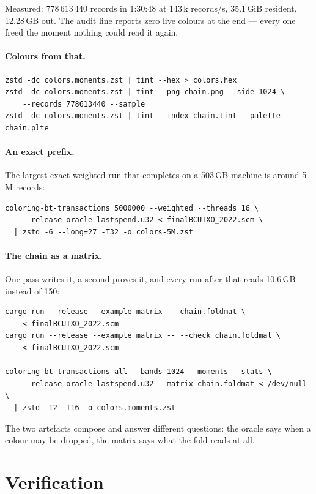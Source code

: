 \documentclass[11pt,a4paper]{article}
\begin{document}
Measured: $778\,613\,440$ records in 1:30:48 at 143\,k records/s, 35.1\,GiB
resident, 12.28\,GB out. The audit line reports zero live colours at the end ---
every one freed the moment nothing could read it again.

\paragraph{Colours from that.}

\begin{lstlisting}
zstd -dc colors.moments.zst | tint --hex > colors.hex
zstd -dc colors.moments.zst | tint --png chain.png --side 1024 \
    --records 778613440 --sample
zstd -dc colors.moments.zst | tint --index chain.tint --palette chain.plte
\end{lstlisting}

\paragraph{An exact prefix.} The largest exact weighted run that completes on a
503\,GB machine is around 5\,M records:

\begin{lstlisting}
coloring-bt-transactions 5000000 --weighted --threads 16 \
    --release-oracle lastspend.u32 < finalBCUTXO_2022.scm \
  | zstd -6 --long=27 -T32 -o colors-5M.zst
\end{lstlisting}

\paragraph{The chain as a matrix.} One pass writes it, a second proves it, and
every run after that reads 10.6\,GB instead of 150:

\begin{lstlisting}
cargo run --release --example matrix -- chain.foldmat \
    < finalBCUTXO_2022.scm
cargo run --release --example matrix -- --check chain.foldmat \
    < finalBCUTXO_2022.scm

coloring-bt-transactions all --bands 1024 --moments --stats \
    --release-oracle lastspend.u32 --matrix chain.foldmat < /dev/null \
  | zstd -12 -T16 -o colors.moments.zst
\end{lstlisting}

The two artefacts compose and answer different questions: the oracle says when a
colour may be dropped, the matrix says what the fold reads at all.

\section{Verification}
\label{sec:verification}
\end{document}
